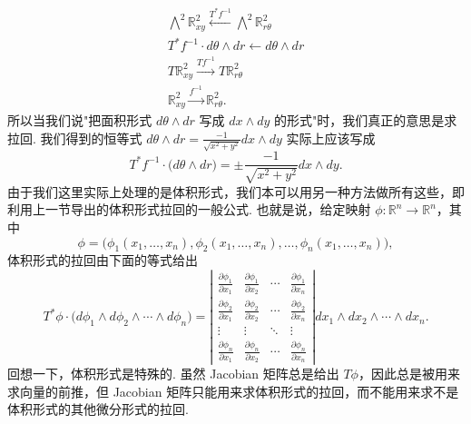 \[
\begin{gathered}
\bigwedge^2\mathbb{R}^2_{xy}\xleftarrow{T^*f^{-1}}\bigwedge^2\mathbb{R}^2_{r\theta}\\
T^*f^{-1}\cdot d\theta\wedge dr\longleftarrow d\theta\wedge dr\\
T\mathbb{R}^2_{xy}\xrightarrow{Tf^{-1}}T\mathbb{R}^2_{r\theta}\\
\mathbb{R}^2_{xy}\xrightarrow{f^{-1}}\mathbb{R}^2_{r\theta}.
\end{gathered}
\]
所以当我们说"把面积形式 $d\theta\wedge dr$ 写成 $dx\wedge dy$ 的形式"时，我们真正的意思是求拉回. 我们得到的恒等式 $d\theta\wedge dr=\frac{-1}{\sqrt{x^2+y^2}}dx\wedge dy$ 实际上应该写成
\[
T^*f^{-1}\cdot\bigl(d\theta\wedge dr\bigr)=\pm\frac{-1}{\sqrt{x^2+y^2}}dx\wedge dy.
\]
由于我们这里实际上处理的是体积形式，我们本可以用另一种方法做所有这些，即利用上一节导出的体积形式拉回的一般公式. 也就是说，给定映射 $\phi:\mathbb{R}^n\to\mathbb{R}^n$，其中
\[
\phi=\bigl(\phi_1(x_1,\ldots,x_n),\phi_2(x_1,\ldots,x_n),\ldots,\phi_n(x_1,\ldots,x_n)\bigr),
\]
体积形式的拉回由下面的等式给出
\[
T^*\phi\cdot\bigl(d\phi_1\wedge d\phi_2\wedge\cdots\wedge d\phi_n\bigr)
=\left|\begin{matrix}
\frac{\partial\phi_1}{\partial x_1}&\frac{\partial\phi_1}{\partial x_2}&\cdots&\frac{\partial\phi_1}{\partial x_n}\\
\frac{\partial\phi_2}{\partial x_1}&\frac{\partial\phi_2}{\partial x_2}&\cdots&\frac{\partial\phi_2}{\partial x_n}\\
\vdots&\vdots&\ddots&\vdots\\
\frac{\partial\phi_n}{\partial x_1}&\frac{\partial\phi_n}{\partial x_2}&\cdots&\frac{\partial\phi_n}{\partial x_n}
\end{matrix}\right|dx_1\wedge dx_2\wedge\cdots\wedge dx_n.
\]
回想一下，体积形式是特殊的. 虽然 Jacobian 矩阵总是给出 $T\phi$，因此总是被用来求向量的前推，但 Jacobian 矩阵只能用来求体积形式的拉回，而不能用来求不是体积形式的其他微分形式的拉回.


